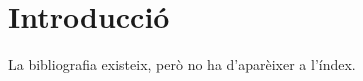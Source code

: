 \documentclass[
  CAT,MEM,no-cover,no-toc,
  bibliography={fixtures/pxBibliography.references}
]{P3CTeX}
\begin{document}
\tableofcontents
\chapter{Introducció}
La bibliografia existeix, però no ha d'aparèixer a l'índex.
\end{document}
